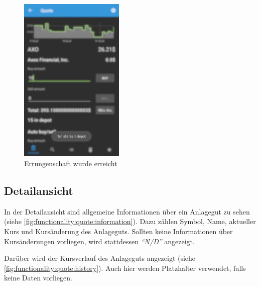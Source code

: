 \documentclass[a4paper]{article}
\begin{document}
\begin{figure}[H]
    \centering
    \includegraphics[height=8cm,keepaspectratio]{./images/achievement_reached.png}
    \caption{Errungenschaft wurde erreicht}
    \label{fig:functionality:achievements:reached}
\end{figure}


\subsection{Detailansicht}
\label{subsec:functionality:quote}
In der Detailansicht sind allgemeine Informationen über ein Anlagegut zu sehen (siehe \autoref{fig:functionality:quote:information}).
Dazu zählen Symbol, Name, aktueller Kurs und Kursänderung des Anlageguts.
Sollten keine Informationen über Kursänderungen vorliegen, wird stattdessen \textit{"`N/D"'} angezeigt.

Darüber wird der Kursverlauf des Anlageguts angezeigt (siehe \autoref{fig:functionality:quote:history}).
Auch hier werden Platzhalter verwendet, falls keine Daten vorliegen.
\end{document}
